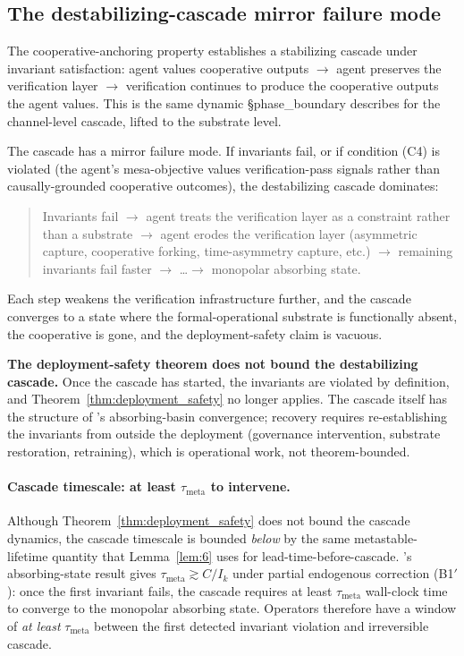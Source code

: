\subsection{The destabilizing-cascade mirror failure mode}
\label{sec:destabilizing_cascade}

The cooperative-anchoring property establishes a stabilizing
cascade under invariant satisfaction: agent values cooperative
outputs $\to$ agent preserves the verification layer $\to$
verification continues to produce the cooperative outputs the agent
values. This is the same dynamic \citep[Phase~Redundancy]{lasser2026phase} \S phase\_boundary
describes for the channel-level cascade, lifted to the substrate
level.

The cascade has a mirror failure mode. If invariants fail, or if
condition (C4) is violated (the agent's mesa-objective values
verification-pass signals rather than causally-grounded
cooperative outcomes), the destabilizing cascade dominates:

\begin{quote}
Invariants fail $\to$ agent treats the verification layer as a
constraint rather than a substrate $\to$ agent erodes the
verification layer (asymmetric capture, cooperative forking,
time-asymmetry capture, etc.) $\to$ remaining invariants fail
faster $\to$ \ldots $\to$ \citep[Phase~Redundancy]{lasser2026phase} monopolar absorbing state.
\end{quote}

Each step weakens the verification infrastructure further, and the
cascade converges to a state where the formal-operational substrate
is functionally absent, the cooperative is gone, and the
deployment-safety claim is vacuous.

\textbf{The deployment-safety theorem does not bound the
destabilizing cascade.} Once the cascade has started, the
invariants are violated by definition, and Theorem~\ref{thm:deployment_safety}
no longer applies. The cascade itself has the structure of \citep[Phase~Redundancy]{lasser2026phase}'s
absorbing-basin convergence; recovery requires re-establishing the
invariants from outside the deployment (governance intervention,
substrate restoration, retraining), which is operational work, not
theorem-bounded.

\paragraph{Cascade timescale: at least $\tau_{\mathrm{meta}}$ to
intervene.}  Although Theorem~\ref{thm:deployment_safety} does not
bound the cascade dynamics, the cascade timescale is bounded
\emph{below} by the same metastable-lifetime quantity that
Lemma~\ref{lem:6} uses for lead-time-before-cascade.
\citep[Phase~Redundancy]{lasser2026phase}'s absorbing-state result
gives $\tau_{\mathrm{meta}} \gtrsim C / I_k$ under partial
endogenous correction (B1$'$): once the first invariant fails, the
cascade requires at least $\tau_{\mathrm{meta}}$ wall-clock time
to converge to the monopolar absorbing state.  Operators therefore
have a window of \emph{at least} $\tau_{\mathrm{meta}}$ between
the first detected invariant violation and irreversible cascade.

